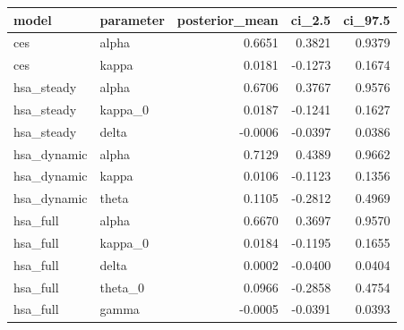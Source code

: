 \begin{tabular}{llrrr}
\toprule
model & parameter & posterior\_mean & ci\_2.5 & ci\_97.5 \\
\midrule
ces & alpha & 0.6651 & 0.3821 & 0.9379 \\
ces & kappa & 0.0181 & -0.1273 & 0.1674 \\
hsa\_steady & alpha & 0.6706 & 0.3767 & 0.9576 \\
hsa\_steady & kappa\_0 & 0.0187 & -0.1241 & 0.1627 \\
hsa\_steady & delta & -0.0006 & -0.0397 & 0.0386 \\
hsa\_dynamic & alpha & 0.7129 & 0.4389 & 0.9662 \\
hsa\_dynamic & kappa & 0.0106 & -0.1123 & 0.1356 \\
hsa\_dynamic & theta & 0.1105 & -0.2812 & 0.4969 \\
hsa\_full & alpha & 0.6670 & 0.3697 & 0.9570 \\
hsa\_full & kappa\_0 & 0.0184 & -0.1195 & 0.1655 \\
hsa\_full & delta & 0.0002 & -0.0400 & 0.0404 \\
hsa\_full & theta\_0 & 0.0966 & -0.2858 & 0.4754 \\
hsa\_full & gamma & -0.0005 & -0.0391 & 0.0393 \\
\bottomrule
\end{tabular}
